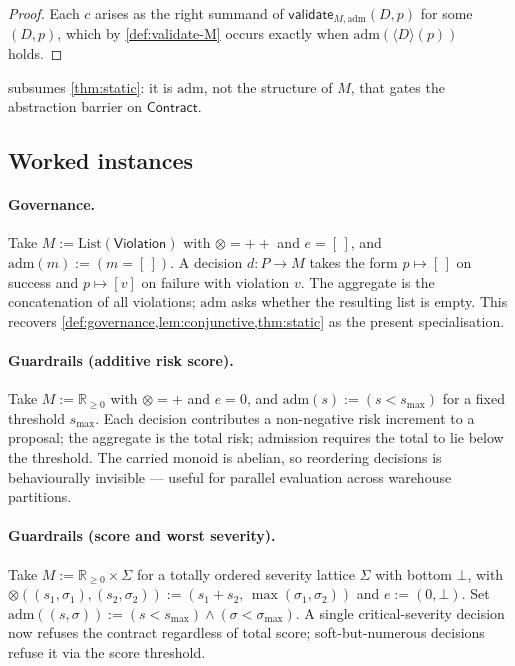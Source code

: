 \documentclass[journal,10pt]{IEEEtran}
\theoremstyle{plain}
\theoremstyle{definition}
\theoremstyle{remark}
\newcommand{\Contract}{\mathsf{Contract}}
\newcommand{\Violation}{\mathsf{Violation}}
\newcommand{\Validate}{\mathsf{validate}}
\begin{document}
\begin{proof}
Each $c$ arises as the right summand of
$\Validate_{M, \mathrm{adm}}(D, p)$ for some $(D, p)$, which by
\cref{def:validate-M} occurs exactly when
$\mathrm{adm}(\langle D \rangle(p))$ holds.
\end{proof}

 subsumes \cref{thm:static}: it is
$\mathrm{adm}$, not the structure of $M$, that gates the
abstraction barrier on $\Contract$.

\subsection{Worked instances}

\paragraph*{Governance.}
Take $M := \mathrm{List}(\Violation)$ with $\otimes = +\!\!+$ and
$e = [\,]$, and $\mathrm{adm}(m) := (m = [\,])$. A decision $d
\colon P \to M$ takes the form $p \mapsto [\,]$ on success and
$p \mapsto [v]$ on failure with violation $v$. The aggregate is
the concatenation of all violations; $\mathrm{adm}$ asks whether
the resulting list is empty. This recovers
\cref{def:governance,lem:conjunctive,thm:static} as the present
specialisation.

\paragraph*{Guardrails (additive risk score).}
Take $M := \mathbb{R}_{\geq 0}$ with $\otimes = +$ and $e = 0$,
and $\mathrm{adm}(s) := (s < s_{\max})$ for a fixed threshold
$s_{\max}$. Each decision contributes a non-negative risk
increment to a proposal; the aggregate is the total risk;
admission requires the total to lie below the threshold. The
carried monoid is abelian, so reordering decisions is
behaviourally invisible — useful for parallel evaluation across
warehouse partitions.

\paragraph*{Guardrails (score and worst severity).}
Take $M := \mathbb{R}_{\geq 0} \times \Sigma$ for a totally
ordered severity lattice $\Sigma$ with bottom $\bot$, with
$\otimes((s_1, \sigma_1), (s_2, \sigma_2)) := (s_1 + s_2,\,
\max(\sigma_1, \sigma_2))$ and $e := (0, \bot)$. Set
$\mathrm{adm}((s, \sigma)) := (s < s_{\max}) \wedge (\sigma <
\sigma_{\max})$. A single critical-severity decision now refuses
the contract regardless of total score; soft-but-numerous
decisions refuse it via the score threshold.
\end{document}
